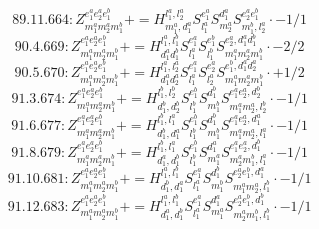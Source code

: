 \documentclass[letterpaper,10pt,fleqn,leqno,onecolumn]{article}
\begin{document}
\begin{equation} \;\;\;\;\;\;  89.11.664: Z^{e_{1}^{a}e_{2}^{a}e_{1}^{b}}_{m_{1}^{a}m_{2}^{a}m_{1}^{b}}+=H^{l_{1}^{a},l_{2}^{a}}_{m_{1}^{a},d_{1}^{a}}S^{e_{1}^{a}}_{l_{1}^{a}}S^{d_{1}^{a}}_{m_{2}^{a}}S^{e_{2}^{a}e_{1}^{b}}_{m_{1}^{b},l_{2}^{a}}\cdot -1/1 \end{equation}
\begin{equation} \;\;\;\;\;\;  90.4.669: Z^{e_{1}^{a}e_{2}^{a}e_{1}^{b}}_{m_{1}^{a}m_{2}^{a}m_{1}^{b}}+=H^{l_{1}^{a},l_{1}^{b}}_{d_{1}^{a}d_{1}^{b}}S^{e_{1}^{a}}_{l_{1}^{a}}S^{e_{1}^{b}}_{l_{1}^{b}}S^{e_{2}^{a},d_{1}^{a}d_{1}^{b}}_{m_{1}^{a}m_{2}^{a}m_{1}^{b}}\cdot -2/2 \end{equation}
\begin{equation} \;\;\;\;\;\;  90.5.670: Z^{e_{1}^{a}e_{2}^{a}e_{1}^{b}}_{m_{1}^{a}m_{2}^{a}m_{1}^{b}}+=H^{l_{1}^{a},l_{2}^{a}}_{d_{1}^{a}d_{2}^{a}}S^{e_{1}^{a}}_{l_{1}^{a}}S^{e_{2}^{a}}_{l_{2}^{a}}S^{e_{1}^{b},d_{1}^{a}d_{2}^{a}}_{m_{1}^{a}m_{2}^{a}m_{1}^{b}}\cdot +1/2 \end{equation}
\begin{equation} \;\;\;\;\;\;  91.3.674: Z^{e_{1}^{a}e_{2}^{a}e_{1}^{b}}_{m_{1}^{a}m_{2}^{a}m_{1}^{b}}+=H^{l_{1}^{b},l_{2}^{b}}_{d_{1}^{b},d_{2}^{b}}S^{e_{1}^{b}}_{l_{1}^{b}}S^{d_{1}^{b}}_{m_{1}^{b}}S^{e_{1}^{a}e_{2}^{a},d_{2}^{b}}_{m_{1}^{a}m_{2}^{a},l_{2}^{b}}\cdot -1/1 \end{equation}
\begin{equation} \;\;\;\;\;\;  91.6.677: Z^{e_{1}^{a}e_{2}^{a}e_{1}^{b}}_{m_{1}^{a}m_{2}^{a}m_{1}^{b}}+=H^{l_{1}^{b},l_{1}^{a}}_{d_{1}^{b},d_{1}^{a}}S^{e_{1}^{b}}_{l_{1}^{b}}S^{d_{1}^{b}}_{m_{1}^{b}}S^{e_{1}^{a}e_{2}^{a},d_{1}^{a}}_{m_{1}^{a}m_{2}^{a},l_{1}^{a}}\cdot -1/1 \end{equation}
\begin{equation} \;\;\;\;\;\;  91.8.679: Z^{e_{1}^{a}e_{2}^{a}e_{1}^{b}}_{m_{1}^{a}m_{2}^{a}m_{1}^{b}}+=H^{l_{1}^{b},l_{1}^{a}}_{d_{1}^{a},d_{1}^{b}}S^{e_{1}^{b}}_{l_{1}^{b}}S^{d_{1}^{a}}_{m_{1}^{a}}S^{e_{1}^{a}e_{2}^{a},d_{1}^{b}}_{m_{2}^{a}m_{1}^{b},l_{1}^{a}}\cdot -1/1 \end{equation}
\begin{equation} \;\;\;\;\;\;  91.10.681: Z^{e_{1}^{a}e_{2}^{a}e_{1}^{b}}_{m_{1}^{a}m_{2}^{a}m_{1}^{b}}+=H^{l_{1}^{a},l_{1}^{b}}_{d_{1}^{b},d_{1}^{a}}S^{e_{1}^{a}}_{l_{1}^{a}}S^{d_{1}^{b}}_{m_{1}^{b}}S^{e_{2}^{a}e_{1}^{b},d_{1}^{a}}_{m_{1}^{a}m_{2}^{a},l_{1}^{b}}\cdot -1/1 \end{equation}
\begin{equation} \;\;\;\;\;\;  91.12.683: Z^{e_{1}^{a}e_{2}^{a}e_{1}^{b}}_{m_{1}^{a}m_{2}^{a}m_{1}^{b}}+=H^{l_{1}^{a},l_{1}^{b}}_{d_{1}^{a},d_{1}^{b}}S^{e_{1}^{a}}_{l_{1}^{a}}S^{d_{1}^{a}}_{m_{1}^{a}}S^{e_{2}^{a}e_{1}^{b},d_{1}^{b}}_{m_{2}^{a}m_{1}^{b},l_{1}^{b}}\cdot -1/1 \end{equation}
\end{document}
